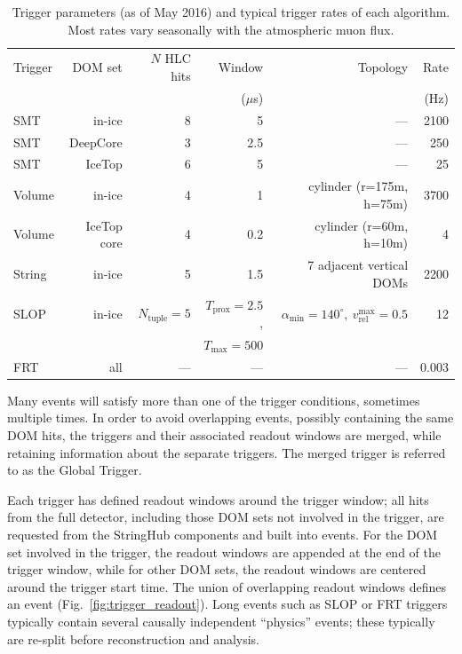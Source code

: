 \begin{table}
  \centering \footnotesize
\caption{Trigger parameters (as of May 2016) and typical trigger
  rates of each algorithm.  Most rates vary seasonally with the atmospheric
  muon flux.}  
\begin{tabular}{lrrrrr}
  \hline Trigger & DOM set & $N$ HLC hits & Window & Topology & Rate\\
  & & & ($\mu$s) & & (Hz) \\
  \hline
  SMT & in-ice & 8 & 5 & --- & 2100\\
  SMT & DeepCore & 3 & 2.5 & --- & 250\\
  SMT & IceTop & 6 & 5 & --- & 25\\
  Volume & in-ice & 4 & 1 & cylinder (r=175m, h=75m) & 3700\\
  Volume & IceTop core & 4 & 0.2 & cylinder (r=60m, h=10m) & 4\\
  String & in-ice & 5 & 1.5 & 7 adjacent vertical DOMs & 2200\\
  SLOP & in-ice & $N_{\mathrm{tuple}} = 5$ & $T_{\mathrm{prox}} = 2.5$, &
  $\alpha_{\mathrm{min}} = 140^\circ,\ v_{\mathrm{rel}}^{\mathrm{max}} = 0.5$ & 12\\
  & & & $T_{\mathrm{max}} = 500$ & &\\
  FRT & all & --- & --- & --- & 0.003\\
  \hline
\end{tabular}
\label{tab:triggers}
\end{table}

Many events will satisfy more than one of the trigger conditions, sometimes
multiple times.  In order to avoid overlapping events, possibly containing
the same DOM hits, the triggers and their associated readout windows are
merged, while retaining information about the separate triggers.  The
merged trigger is referred to as the Global Trigger.

Each trigger has defined readout windows around the trigger window; all
hits from the full detector, including those DOM sets not involved in the trigger,
are requested from the StringHub components and built into events.  For the
DOM set involved in the trigger, the readout windows are appended at the end of the trigger
window, while for other DOM sets, the readout windows are centered around
the trigger start time.  The union of overlapping readout windows defines
an event (Fig.~\ref{fig:trigger_readout}).  Long events such as SLOP or FRT
triggers typically contain several causally independent ``physics'' events;
these typically are re-split before reconstruction and analysis.

